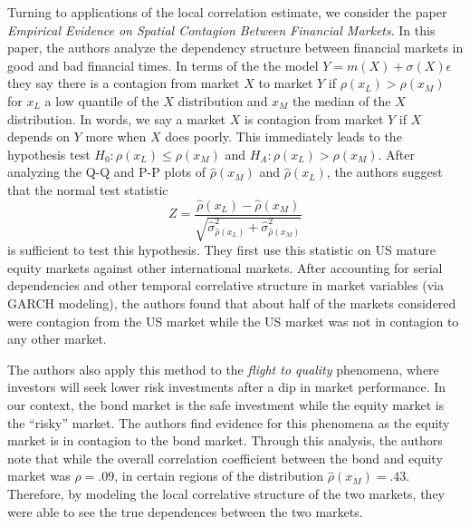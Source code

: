 \documentclass[12pt]{article}  %
\begin{document}
Turning to applications of the local correlation estimate, we consider the paper \textit{Empirical Evidence on Spatial Contagion Between Financial Markets}. In this paper, the authors analyze the dependency structure between financial markets in good and bad financial times. In terms of the the model $Y = m(X) + \sigma(X)\epsilon$ they say there is a contagion from market $X$ to market $Y$ if $\rho(x_L)>\rho(x_M)$ for $x_L$ a low quantile of the $X$ distribution and $x_M$ the median of the $X$ distribution. In words, we say a market $X$ is contagion from market $Y$ if $X$ depends on $Y$ more when $X$ does poorly. This immediately leads to the hypothesis test $H_0: \rho(x_L)\leq \rho(x_M)$ and $H_A: \rho(x_L)>\rho(x_M)$. After analyzing the Q-Q and P-P plots of $\hat{\rho}(x_M)$ and $\hat{\rho}(x_L)$, the authors suggest that the normal test statistic $$Z = \frac{\hat{\rho}(x_L) - \hat{\rho}(x_M)}{\sqrt{\hat{\sigma}^2_{\hat{\rho}(x_L)} + \hat{\sigma}^2_{\hat{\rho}(x_M)}}}$$is sufficient to test this hypothesis. They first use this statistic on US mature equity markets against other international markets. After accounting for serial dependencies and other temporal correlative structure in market variables (via GARCH modeling), the authors found that about half of the markets considered were contagion from the US market while the US market was not in contagion to any other market. 

The authors also apply this method to the \textit{flight to quality} phenomena, where investors will seek lower risk investments after a dip in market performance. In our context, the bond market is the safe investment while the equity market is the ``risky'' market. The authors find evidence for this phenomena as the equity market is in contagion to the bond market. Through this analysis, the authors note that while the overall correlation coefficient between the bond and equity market was $\hat{\rho}= .09$, in certain regions of the distribution $\hat{\rho}(x_M) = .43$. Therefore, by modeling the local correlative structure of the two markets, they were able to see the true dependences between the two markets. 
\end{document}
